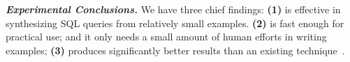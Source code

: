 \vspace{.5mm}
\noindent \textbf{\textit{Experimental Conclusions.}}
We have three chief findings: \textbf{(1)}
\ourtool is effective in synthesizing SQL queries
from relatively small examples.
\textbf{(2)} \ourtool is fast enough for practical use;
and it only needs a small amount of human
efforts in writing examples;
\textbf{(3)} \ourtool produces significantly better results
than an existing technique~\cite{Tran:2009}.




